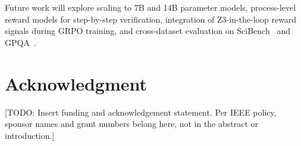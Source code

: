 \documentclass{ieeeaccess}
\begin{document}
Future work will explore scaling to 7B and 14B parameter models,
process-level reward models for step-by-step verification,
integration of Z3-in-the-loop reward signals during GRPO training,
and cross-dataset evaluation on SciBench~\cite{b15} and GPQA~\cite{b17}.

\section*{Acknowledgment}

[TODO: Insert funding and acknowledgement statement.
Per IEEE policy, sponsor names and grant numbers belong here, not in the
abstract or introduction.]
\end{document}
